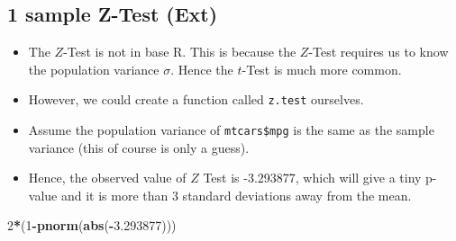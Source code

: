 \documentclass[]{article}
\newenvironment{Shaded}{\begin{snugshade}}{\end{snugshade}}
\newcommand{\CommentTok}[1]{\textcolor[rgb]{0.56,0.35,0.01}{\textit{#1}}}
\newcommand{\ControlFlowTok}[1]{\textcolor[rgb]{0.13,0.29,0.53}{\textbf{#1}}}
\newcommand{\DecValTok}[1]{\textcolor[rgb]{0.00,0.00,0.81}{#1}}
\newcommand{\FloatTok}[1]{\textcolor[rgb]{0.00,0.00,0.81}{#1}}
\newcommand{\KeywordTok}[1]{\textcolor[rgb]{0.13,0.29,0.53}{\textbf{#1}}}
\newcommand{\NormalTok}[1]{#1}
\newcommand{\OperatorTok}[1]{\textcolor[rgb]{0.81,0.36,0.00}{\textbf{#1}}}
\newcommand{\StringTok}[1]{\textcolor[rgb]{0.31,0.60,0.02}{#1}}
\providecommand{\tightlist}{%
  \setlength{\itemsep}{0pt}\setlength{\parskip}{0pt}}
\begin{document}
\hypertarget{sample-z-test-ext}{%
\subsection{1 sample Z-Test (Ext)}\label{sample-z-test-ext}}

\begin{itemize}
\tightlist
\item
  The \(Z\)-Test is not in base R. This is because the \(Z\)-Test requires us to know the population variance \(\sigma\). Hence the \(t\)-Test is much more common.
\item
  However, we could create a function called \texttt{z.test} ourselves.
\item
  Assume the population variance of \texttt{mtcars\$mpg} is the same as the sample variance (this of course is only a guess).
\end{itemize}

\begin{Shaded}
\end{Shaded}

\begin{itemize}
\tightlist
\item
  Hence, the observed value of \(Z\) Test is -3.293877, which will give a tiny p-value and it is more than 3 standard deviations away from the mean.
\end{itemize}

\begin{Shaded}
\begin{Highlighting}[]
\DecValTok{2}\OperatorTok{*}\NormalTok{(}\DecValTok{1}\OperatorTok{-}\KeywordTok{pnorm}\NormalTok{(}\KeywordTok{abs}\NormalTok{(}\OperatorTok{-}\FloatTok{3.293877}\NormalTok{)))}
\end{Highlighting}
\end{Shaded}
\end{document}
